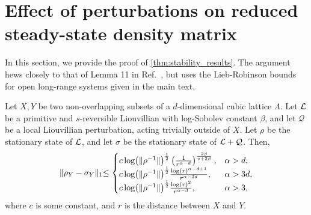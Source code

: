\section{Effect of perturbations on reduced steady-state density matrix}
\label{app:proof-stability}
In this section, we provide the proof of \cref{thm:stability_results}. The argument hews closely to that of Lemma 11 in Ref.~\cite{Kastoryano2013}, but uses the Lieb-Robinson bounds for open long-range systems given in the main text.
\setcounter{theorem}{1}
\begin{theorem}
\label{thm:stability_results_2}
Let $X,Y$ be two non-overlapping subsets of a $d$-dimensional cubic lattice $\Lambda$.  Let $\mathcal{L} $  be a primitive and $s$-reversible Liouvillian with log-Sobolev constant $\beta$, and let $\mathcal{Q}$ be a local Liouvillian perturbation, acting trivially outside of $X$. Let $\rho$ be the stationary state of $\mathcal{L}$, and let $\sigma$ be the stationary state of $\mathcal{L}  + \mathcal{Q}$. Then,
\begin{equation}
\label{eq:perturbation_bounds_app}
\lVert \rho_Y - \sigma_Y  \lVert_1 \leq \begin{cases}
       c \log (  \lVert \rho^{-1}  \lVert)^{\frac12} \left(\frac1{r^{\alpha - d}} \right)^{\frac{2 \beta}{ v + 2\beta}},& \al > d,
    \\ c \log (  \lVert \rho^{-1}  \lVert)^{\frac12} \frac{\log(r)^{\al-d+1}}{r^{\al-3d}},& \al > 3d, %
    \\ c \log (  \lVert \rho^{-1}  \lVert)^{\frac12} \frac{\log(r)^2}{r^{\al-3}},& \al> 3,
    \end{cases}
\end{equation}
where $c$ is some constant, and $r$ is the distance between $X$ and $Y$.
\end{theorem}
